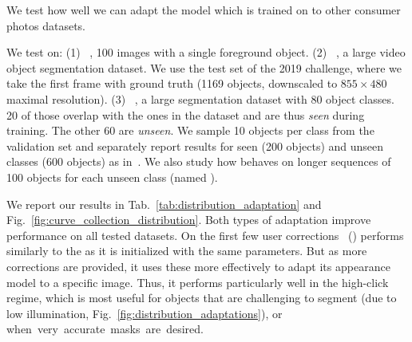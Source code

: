 \label{sec:in_domain_adaptation}
We test how well we can adapt the model which is trained on \pascal{} to other consumer photos datasets.

We test on: (1) \emph{\berkeley{}}~\cite{mcguinness10book}, 100 images with a single foreground object.
(2) \emph{\youtubeVOS{}}~\cite{xu18arxiv}, a large video object segmentation dataset.
We use the test set of the 2019 challenge, where we take the first frame with ground truth (1169 objects, downscaled to $855\times480$ maximal resolution).
(3) \emph{\coco{}}~\cite{lin14eccv}, a large segmentation dataset with 80 object classes.
20 of those overlap with the ones in the \pascal{} dataset and are thus \emph{seen} during training. The other 60 are \emph{unseen}.
We sample 10 objects
per class from the validation set and separately report results for seen (200 objects) and unseen classes (600 objects) as in~\cite{xu16cvpr,majumder19cvpr}.
We also study how \datasetSGD{} behaves on longer sequences of 100 objects for each unseen class (named {\em \cocounseenlarge{}}).

We report our results in Tab.~\ref{tab:distribution_adaptation} and Fig.~\ref{fig:curve_collection_distribution}.
Both types of adaptation
improve performance on all tested datasets.
On the first few user corrections \textit{\imageSGD{}}~(\imageadaptationshort{}) performs similarly to the \fixedmodellong{} as it is initialized with the same parameters. But as more corrections are provided, it uses these more effectively to adapt its appearance model to a specific image.
Thus, it performs particularly well in the high-click regime,
which is most useful for objects that are challenging to segment (\eg due to low illumination, Fig.~\ref{fig:distribution_adaptations}),
or when~very~accurate~masks~are~desired.

